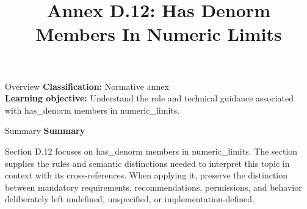 \documentclass[10pt,letterpaper]{article}
\title{Annex D.12: Has Denorm Members In Numeric Limits}
\author{}
\date{}
\begin{document}
\maketitle
\begin{CornellOverviewBox}{Overview}
\textbf{Classification:} Normative annex\\[2pt]
\textbf{Learning objective:} Understand the role and technical guidance associated with has\_denorm members in numeric\_limits.
\end{CornellOverviewBox}\begin{CornellSummaryBox}{Summary}
{\sffamily\bfseries\color{Accent} Summary}\par\vspace{3pt}Section D.12 focuses on has\_denorm members in numeric\_limits. The section supplies the rules and semantic distinctions needed to interpret this topic in context with its cross-references. When applying it, preserve the distinction between mandatory requirements, recommendations, permissions, and behavior deliberately left undefined, unspecified, or implementation-defined.
\end{CornellSummaryBox}
\end{document}
